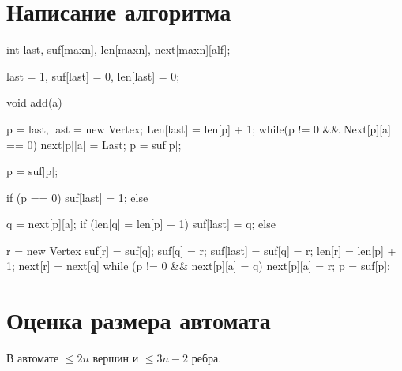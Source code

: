 \section{Написание алгоритма}
\begin{cppcode}
int last, suf[maxn], len[maxn], next[maxn][alf];

last = 1, 
suf[last] = 0, 
len[last] = 0;

void add(a) {
    p = last, last = new Vertex;
    Len[last] = len[p] + 1;
    while(p != 0 && Next[p][a] == 0) {
        next[p][a] = Last;
        p = suf[p];
    }
    
    p = suf[p];
    
    if (p == 0) {
        suf[last] = 1;
    } else {
        q = next[p][a];
        if (len[q] = len[p] + 1) {
            suf[last] = q;
        } else {
            r = new Vertex
            suf[r] = suf[q];
            suf[q] = r;
            suf[last] = suf[q] = r;
            len[r] = len[p] + 1;
            next[r] = next[q]
            while (p != 0 && next[p][a] = q)  {
                next[p][a] = r;
                p = suf[p];
            }

        }
    }
}

\end{cppcode}
\section{Оценка размера автомата}
\begin{theorem}
В автомате $\le 2n$ вершин и $\le 3n - 2$ ребра. 
\end{theorem}

